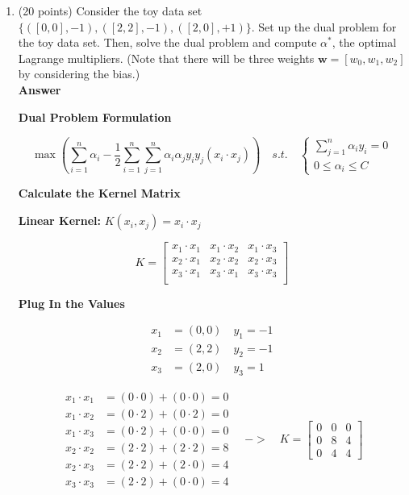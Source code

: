\documentclass[11pt]{article}
\begin{document}
\begin{enumerate}

\item (20 points) Consider the toy data set $\{([0, 0], -1),
([2, 2], -1), ([2, 0], +1)\}$. Set up the dual problem for
the toy data set. Then, solve the dual problem and compute
$\alpha^*$, the optimal Lagrange multipliers. (Note that there will
be three weights $\boldsymbol w = [w_0, w_1, w_2]$ by considering
the bias.)\\

\textbf{Answer}

\textbf{Dual Problem Formulation}

\[\max(\sum^n_{i=1} \alpha_i - \frac{1}{2}\sum^n_{i=1}\sum^n_{j=1}\alpha_i\alpha_j y_i y_j ({x_i \cdot x_j})) \quad s.t. \quad
    \begin{cases}
         \sum^n_{j=1} \alpha_i y_i= 0\\
        0 \leq \alpha_i \leq C
    \end{cases}\]

\textbf{Calculate the Kernel Matrix}

\textbf{Linear Kernel:} $K(x_i, x_j) = x_i \cdot x_j$

\[K = \begin{bmatrix}
    x_1 \cdot x_1 & x_1 \cdot x_2 & x_1 \cdot x_3 \\
    x_2 \cdot x_1 & x_2 \cdot x_2 & x_2 \cdot x_3 \\
    x_3 \cdot x_1 & x_3 \cdot x_1 & x_3 \cdot x_3 \\
\end{bmatrix}\]

\textbf{Plug In the Values}

\[\begin{aligned}
x_1&=(0,0) \quad y_1=-1 \\
x_2&=(2,2) \quad y_2=-1 \\
x_3&=(2,0) \quad y_3=1
\end{aligned}
\]

\[
\begin{aligned}
x_1 \cdot x_1 &= (0 \cdot 0) + (0 \cdot 0) = 0 \\[5pt]
x_1 \cdot x_2 &= (0 \cdot 2) + (0 \cdot 2) = 0 \\[5pt]
x_1 \cdot x_3 &= (0 \cdot 2) + (0 \cdot 0) = 0 \\[5pt]
x_2 \cdot x_2 &= (2 \cdot 2) + (2 \cdot 2) = 8 \\[5pt]
x_2 \cdot x_3 &= (2 \cdot 2) + (2 \cdot 0) = 4 \\[5pt]
x_3 \cdot x_3 &= (2 \cdot 2) + (0 \cdot 0) = 4
\end{aligned}
\quad -> \quad K = \begin{bmatrix}
            0 & 0 & 0 \\
            0 & 8 & 4 \\
            0 & 4 & 4
        \end{bmatrix}
\]


\end{enumerate}
\end{document}
